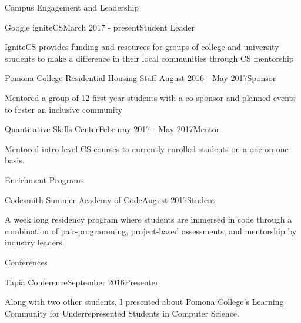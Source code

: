 \documentclass{resume} %
\begin{document}
\begin{rSection}{Campus Engagement and Leadership}

\begin{rSubsection}{Google igniteCS}{March 2017 - present}{Student Leader}
\item IgniteCS provides funding and resources for groups of college and university students to make a difference in their local communities through CS mentorship
\end{rSubsection}


\begin{rSubsection}{Pomona College Residential Housing Staff }{August 2016 - May 2017}{Sponsor}
\item Mentored a group of 12 first year students with a co-sponsor and planned events to foster an inclusive community

\end{rSubsection}


\begin{rSubsection}{Quantitative Skills Center}{Februray 2017 - May 2017}{Mentor}
\item Mentored intro-level CS courses to currently enrolled students on a one-on-one basis.
\end{rSubsection}


\end{rSection}
%
\begin{rSection}{Enrichment Programs}
%
  \begin{rSubsection}{Codesmith Summer Academy of Code}{August 2017}{Student}
  \item A week long residency program where students are immersed in code through a combination of pair-programming, project-based assessments, and mentorship by industry leaders.
  \end{rSubsection}
%
%
\end{rSection}

%
\begin{rSection}{Conferences}
%
  \begin{rSubsection}{Tapia Conference}{September 2016}{Presenter}
  \item Along with two other students, I presented about Pomona College's Learning Community for Underrepresented Students in Computer Science.
  \end{rSubsection}
%
%
\end{rSection}
\end{document}
